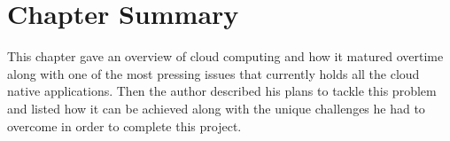 \section{Chapter Summary}

This chapter gave an overview of cloud computing and how it matured overtime along with one of the most pressing issues that currently holds all the cloud native applications. Then the author described his plans to tackle this problem and listed how it can be achieved along with the unique challenges he had to overcome in order to complete this project.

